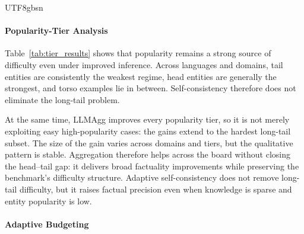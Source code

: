 \documentclass[11pt]{article}
\begin{document}
\begin{CJK*}{UTF8}{gbsn}
\paragraph{Popularity-Tier Analysis}

Table~\ref{tab:tier_results} shows that popularity remains a strong source of difficulty even under improved inference. Across languages and domains, tail entities are consistently the weakest regime, head entities are generally the strongest, and torso examples lie in between. Self-consistency therefore does not eliminate the long-tail problem.

At the same time, LLMAgg improves every popularity tier, so it is not merely exploiting easy high-popularity cases: the gains extend to the hardest long-tail subset. The size of the gain varies across domains and tiers, but the qualitative pattern is stable. Aggregation therefore helps across the board without closing the head--tail gap: it delivers broad factuality improvements while preserving the benchmark's difficulty structure. Adaptive self-consistency does not remove long-tail difficulty, but it raises factual precision even when knowledge is sparse and entity popularity is low.

\paragraph{Adaptive Budgeting}
\label{sec:adaptive}

\begin{table}
\centering
\small
\setlength{\tabcolsep}{3pt}
\end{table}
\end{CJK*}
\end{document}
